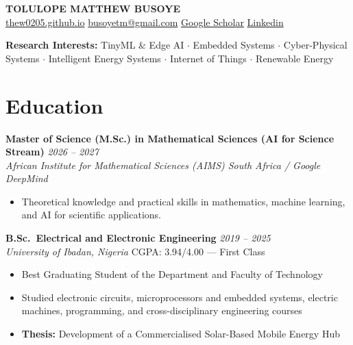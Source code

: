 \documentclass[10pt, a4paper]{article}
\newcommand{\cventry}[4]{%
  \noindent\textbf{#1} \hfill \textit{#2}\\%
  \textit{#3} \hfill \small{#4}\\[-4pt]%
}
\begin{document}
\begin{center}
  {\LARGE\bfseries\color{accent} TOLULOPE MATTHEW BUSOYE}\\[4pt]
  \href{https://thew0205.github.io}{thew0205.github.io} \quad
  \href{mailto:busoyetm@gmail.com}{busoyetm@gmail.com} \quad
  \href{https://scholar.google.com/citations?user=iPShkhUAAAAJ&hl=en}{Google Scholar} \quad
  \href{https://www.linkedin.com/in/tolulopematthewbusoye}{Linkedin}
\end{center}

\noindent\textbf{Research Interests:} TinyML \& Edge AI $\cdot$ Embedded
Systems $\cdot$ Cyber-Physical Systems $\cdot$ Intelligent Energy Systems $\cdot$ Internet of Things $\cdot$ Renewable Energy

\section{Education}

\cventry{Master of Science (M.Sc.) in Mathematical Sciences (AI for Science Stream)}{2026 -- 2027}{African Institute for Mathematical Sciences (AIMS) South Africa / Google DeepMind}{}
\begin{itemize}
  \item Theoretical knowledge and practical skills in mathematics, machine learning, and AI for scientific applications.
\end{itemize}

\vspace{4pt}

\cventry{B.Sc.\ Electrical and Electronic Engineering}{2019 -- 2025}{University of Ibadan, Nigeria}{CGPA: 3.94/4.00 --- First Class}
\begin{itemize}
  \item Best Graduating Student of the Department and Faculty of Technology
  \item Studied electronic circuits, microprocessors and embedded systems, electric machines, programming, and cross-disciplinary engineering courses
  \item \textbf{Thesis:} Development of a Commercialised Solar-Based Mobile Energy Hub
\end{itemize}
\end{document}
